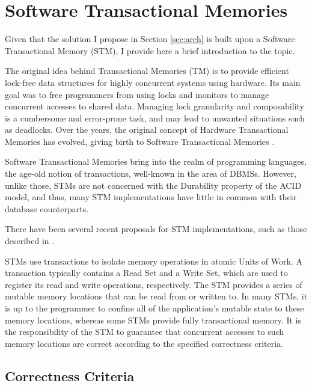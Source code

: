 \section{Software Transactional Memories}
\label{sec:stm}

Given that the solution I propose in Section \ref{sec:arch} is built
upon a Software Transactional Memory (STM), I provide here a brief
introduction to the topic.

The original idea behind Transactional Memories (TM)
\cite{herlihy1993transactional} is to provide efficient lock-free data
structures for highly concurrent systems using hardware. Its main goal
was to free programmers from using locks and monitors to manage
concurrent accesses to shared data. Managing lock granularity and
composability is a cumbersome and error-prone task, and may lead to
unwanted situations such as deadlocks. Over the years, the original
concept of Hardware Transactional Memories has evolved, giving birth
to Software Transactional Memories \cite{shavit1997software}.

Software Transactional Memories bring into the realm of programming
languages, the age-old notion of transactions, well-known in the area
of DBMSs. However, unlike those, STMs are not concerned with the
Durability property of the ACID model, and thus, many STM
implementations have little in common with their database
counterparts.

There have been several recent proposals for STM implementations, such
as those described in \cite{cachopo2006versioned, herlihy2003software,
  marathe2005adaptive, dice2006transactional, riegel2006lazy,
  marathe2006lowering}.

STMs use transactions to isolate memory operations in atomic Units of
Work. A transaction typically contains a Read Set and a Write Set,
which are used to register its read and write operations,
respectively. The STM provides a series of mutable memory locations
that can be read from or written to. In many STMs, it is up to the
programmer to confine all of the application's mutable state to these
memory locations, whereas some STMs provide fully transactional
memory. It is the responsibility of the STM to guarantee that
concurrent accesses to such memory locations are correct according to
the specified correctness criteria.

\subsection{Correctness Criteria}
\label{sec:opacity}

